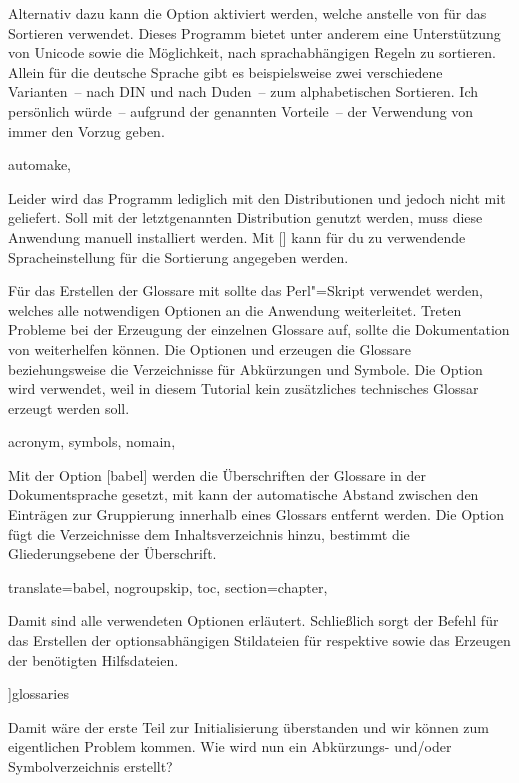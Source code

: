 \documentclass[%
  english,ngerman,%
  cdgeometry=no,DIV=12,automark,%
]{tudscrartcl}
\begin{document}
Alternativ dazu kann die Option  aktiviert werden, welche 
 anstelle von  für das Sortieren 
verwendet. Dieses Programm bietet unter anderem eine Unterstützung von Unicode 
sowie die Möglichkeit, nach sprachabhängigen Regeln zu sortieren. Allein für 
die deutsche Sprache gibt es beispielsweise zwei verschiedene Varianten~-- nach 
DIN und nach Duden~-- zum alphabetischen Sortieren. Ich persönlich würde~-- 
aufgrund der genannten Vorteile~-- der Verwendung von  immer 
den Vorzug geben.
%
\begin{Preamble}
  automake,%
\end{Preamble}
%
Leider wird das Programm  lediglich mit den Distributionen 
 und  jedoch 
nicht mit  geliefert. Soll  
mit der letztgenannten Distribution genutzt werden, muss diese Anwendung 
manuell installiert werden. Mit 
[] kann für  
du zu verwendende Spracheinstellung für die Sortierung angegeben werden.
%
\begin{Preamble}
\end{Preamble}
%
Für das Erstellen der Glossare mit  sollte das Perl"=Skript 
 verwendet werden, welches alle notwendigen 
Optionen an die Anwendung weiterleitet. Treten Probleme bei der Erzeugung der 
einzelnen Glossare auf, sollte die Dokumentation von  
weiterhelfen können.
%
Die Optionen  und  erzeugen die Glossare 
beziehungsweise die Verzeichnisse für Abkürzungen und Symbole. Die Option 
 wird verwendet, weil in diesem Tutorial kein zusätzliches 
technisches Glossar erzeugt werden soll.
%
\begin{Preamble}
  acronym,%
  symbols,%
  nomain,%
\end{Preamble}
%
Mit der Option [babel] werden die Überschriften der Glossare 
in der Dokumentsprache gesetzt, mit  kann der automatische 
Abstand zwischen den Einträgen zur Gruppierung innerhalb eines Glossars 
entfernt werden. Die Option  fügt die Verzeichnisse dem 
Inhaltsverzeichnis hinzu,  bestimmt die Gliederungsebene der 
Überschrift.
%
\begin{Preamble}
  translate=babel,%
  nogroupskip,%
  toc,%
  section=chapter,%
\end{Preamble}
%
Damit sind alle verwendeten Optionen erläutert. Schließlich sorgt der Befehl 
 für das Erstellen der optionsabhängigen Stildateien für 
 respektive  sowie das Erzeugen der 
benötigten Hilfsdateien.
%
\begin{Preamble}
]{glossaries}
\makeglossaries

\end{Preamble}
%
Damit wäre der erste Teil zur Initialisierung überstanden und wir können zum 
eigentlichen Problem kommen. Wie wird nun ein Abkürzungs- und/oder 
Symbolverzeichnis erstellt?
\end{document}
